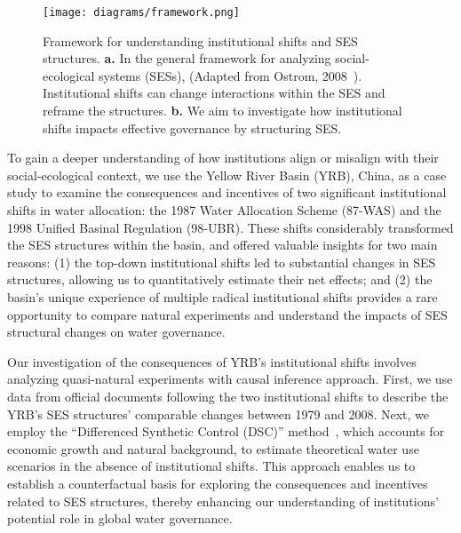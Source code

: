 \begin{figure}[!ht]
	\centering
	\texttt{[image: diagrams/framework.png]}
	\caption{
		Framework for understanding institutional shifts and SES structures. \textbf{a.} In the general framework for analyzing social-ecological systems (SESs), (Adapted from Ostrom, 2008~\cite{ostrom2009}). Institutional shifts can change interactions within the SES and reframe the structures.  \textbf{b.} We aim to investigate how institutional shifts impacts effective governance by structuring SES.}\label{fig:framework}
\end{figure}

To gain a deeper understanding of how institutions align or misalign with their social-ecological context, we use the Yellow River Basin (YRB), China, as a case study to examine the consequences and incentives of two significant institutional shifts in water allocation: the 1987 Water Allocation Scheme (87-WAS) and the 1998 Unified Basinal Regulation (98-UBR).
These shifts considerably transformed the SES structures within the basin, and offered valuable insights for two main reasons:
(1) the top-down institutional shifts led to substantial changes in SES structures, allowing us to quantitatively estimate their net effects; and (2) the basin's unique experience of multiple radical institutional shifts provides a rare opportunity to compare natural experiments and understand the impacts of SES structural changes on water governance.

Our investigation of the consequences of YRB's institutional shifts involves analyzing quasi-natural experiments with causal inference approach.
First, we use data from official documents following the two institutional shifts to describe the YRB's SES structures' comparable changes between 1979 and 2008.
Next, we employ the ``Differenced Synthetic Control (DSC)'' method~\cite{arkhangelsky2021}, which accounts for economic growth and natural background, to estimate theoretical water use scenarios in the absence of institutional shifts.
This approach enables us to establish a counterfactual basis for exploring the consequences and incentives related to SES structures, thereby enhancing our understanding of institutions' potential role in global water governance.
